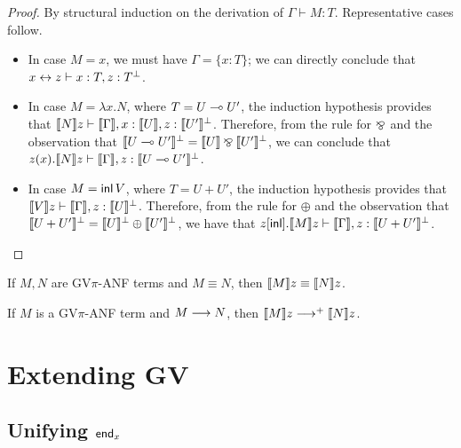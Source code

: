 \documentclass[orivec,envcountsame]{llncs}
\begin{document}
\begin{proof}
  By structural induction on the derivation of $\Gamma \vdash M: T$.  Representative cases follow.
  \begin{itemize}
  \item In case $M = x$, we must have $\Gamma = \{x:T\}$; we can directly conclude that $x \leftrightarrow z
    \vdash x:T,z:T^\perp$.
  \item In case $M = \lambda x.N$, where $T = U \multimap U'$, the induction hypothesis provides that
    $\llbracket N \rrbracket z \vdash \llbracket \Gamma \rrbracket,x:\llbracket U \rrbracket,z:\llbracket U' \rrbracket^\perp$.  Therefore, from the rule for
    $\mathbin\bindnasrepma$ and the observation that $\llbracket U \multimap U' \rrbracket^\perp = \llbracket U \rrbracket \mathbin\bindnasrepma \llbracket U' \rrbracket^\perp$, we can
    conclude that $z(x).\llbracket N \rrbracket z \vdash \llbracket \Gamma \rrbracket, z:\llbracket U \multimap U' \rrbracket^\perp$.
  \item In case $M = \mathsf{inl} \, V$, where $T = U + U'$, the induction hypothesis provides that
    $\llbracket V \rrbracket z \vdash \llbracket \Gamma \rrbracket, z:\llbracket U \rrbracket^\perp$.  Therefore, from the rule for $\oplus$
    and the observation that $\llbracket U + U' \rrbracket^\perp = \llbracket U \rrbracket^\perp \oplus \llbracket U' \rrbracket^\perp$,
    we have that $z[\mathsf{inl}].\llbracket M \rrbracket z \vdash \llbracket \Gamma \rrbracket, z:\llbracket U + U' \rrbracket^\perp$.
  \end{itemize}
\end{proof}


\begin{theorem}
  If $M, N$ are GV$\pi$-ANF terms and $M \equiv N$, then $\llbracket M \rrbracket z \equiv \llbracket N \rrbracket z$.
\end{theorem}

\begin{theorem}
  If $M$ is a GV$\pi$-ANF term and $M \longrightarrow N$, then $\llbracket M \rrbracket z \longrightarrow^+ \llbracket N \rrbracket z$.
\end{theorem}

\section{Extending GV}

\subsection{Unifying $\mathsf{end}_x$}
\end{document}
